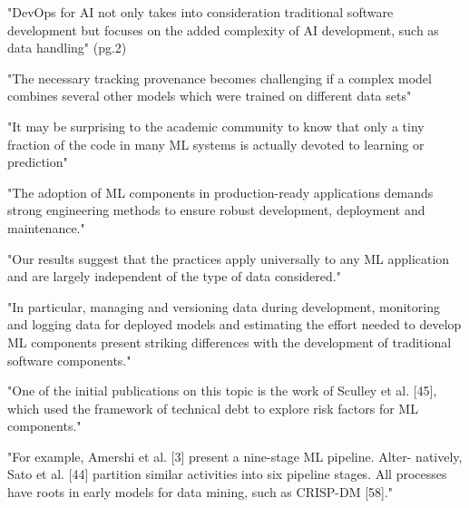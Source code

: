 "DevOps for AI not only takes into consideration traditional software
development but focuses on the added complexity of AI development,
such as data handling" (pg.2)

"The necessary tracking provenance becomes challenging if a complex model
combines several other models which were trained on different data sets"


\parencite{Sculley2015HiddenSystems}

"It may be surprising to the academic community to know that only a tiny fraction
of the code in many ML systems is actually devoted to learning or prediction"


\parencite{Serban2020AdoptionLearning}

"The adoption of ML components in production-ready applications demands strong
engineering methods to ensure robust development, deployment and maintenance."

"Our results suggest that the practices apply universally to any ML application
and are largely independent of the type of data considered."

"In particular, managing and versioning data during development, monitoring
and logging data for deployed models and estimating the effort needed to develop
ML components present striking differences with the development of traditional
software components."

"One of the initial publications on this topic is the work of Sculley et al.
[45], which used the framework of technical debt to explore risk factors for ML
components."

"For example, Amershi et al. [3] present a nine-stage ML pipeline. Alter-
natively, Sato et al. [44] partition similar activities into six pipeline
stages. All processes have roots in early models for data mining, such as
CRISP-DM [58]."


\parencite{Serban2021PracticesApplications}

